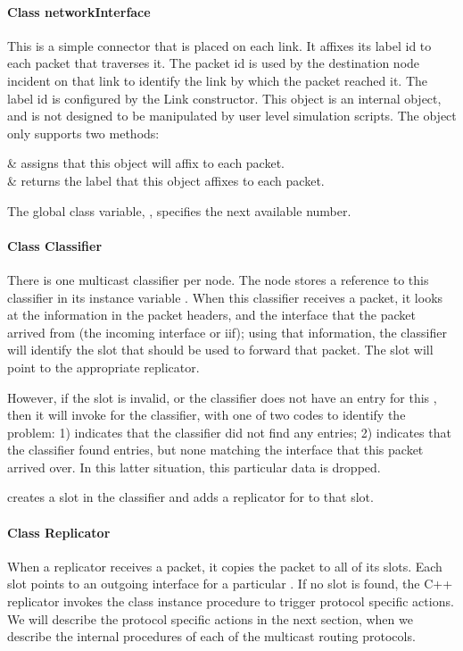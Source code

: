 \paragraph{Class networkInterface}
This is a simple connector that is placed on each link.
It affixes its label id to each packet that traverses it.  
The packet id is used by the destination node incident on that link
to identify the link by which the packet reached it.
The label id is configured by the Link constructor.
This object is an internal object, and is not designed to be manipulated
by user level simulation scripts.
The object only supports two methods:
\begin{alist}
 & assigns  that this object will affix to each packet. \\
 & returns the label that this object affixes to each packet.\\
\end{alist}
The global class variable, , specifies the next available 
 number.

\paragraph{Class Classifier}
There is one multicast classifier per node.
The node stores a reference to this classifier in its instance variable
.
When this classifier receives a packet,
it looks at the  information in the packet headers,
and the interface that the packet arrived from (the incoming interface or iif);
using that information, the classifier will identify the slot
that should be used to forward that packet.  The slot will point
to the appropriate replicator.

However, if the slot is invalid, or the classifier does not have an
entry for this ,
then it will invoke  for the classifier,
with one of two codes to identify the problem:
1)  indicates that the classifier did not find any
 entries;
2)  indicates that the classifier found 
entries, but none matching the interface that this packet arrived over.
In this latter situation, this particular data is dropped.

 creates a slot in the classifier
and adds a replicator for  to that slot.

\paragraph{Class Replicator}
When a replicator receives a packet,
it copies the packet to all of its slots.
Each slot points to an outgoing interface for a particular 
.
If no slot is found, the C++ replicator invokes the class 
instance procedure  to
trigger protocol specific actions.
We will describe the protocol specific actions in the next section,
when we describe the internal procedures of each of the 
multicast routing protocols.

